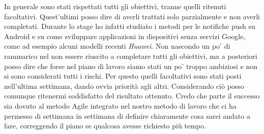 \noindent In generale sono stati rispettati tutti gli obiettivi, tranne quelli ritenuti facoltativi. Quest'ultimi posso
dire di averli trattati solo parzialmente e non averli completati. Durante lo stage ho infatti studiato i metodi per le
notifiche push su \gls{Android} e su come sviluppare applicazioni in dispositivi senza servizi Google, come ad esempio
alcuni modelli recenti \textit{Huawei}. Non nascondo un po' di rammarico nel non essere riuscito a completare tutti gli
obiettivi, ma a posteriori posso dire che forse nel piano di lavoro siamo stati un po' troppo ambiziosi e non si sono
considerati tutti i rischi. Per questo quelli facoltativi sono stati posti nell'ultima settimana, dando ovvia priorità
agli altri. Considerando ciò posso comunque ritenermi soddisfatto del risultato ottenuto. Credo che parte il
successo sia dovuto al metodo \gls{Agile} integrato nel nostro metodo di lavoro che ci ha permesso di settimana in
settimana di definire chiaramente cosa sarei andato a fare, correggendo il piano se qualcosa avesse richiesto più tempo. 

